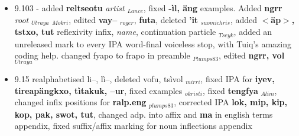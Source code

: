 \documentclass[11pt]{article}
\begin{document}
\begin{itemize}
\item 9.103 - added {\bf reltseotu} {\it artist} $_{Lance}$, fixed {\bf -\`il, \"ang} examples. Added {\bf *ngrr} {\it root} $_{Utraya}$ $_{Mokri}$, edited {\bf vay--} $_{roger}$, {\bf futa}, deleted {\bf *'it} $_{suomichris}$, added {\bf $<$\"ap$>$, tstxo, tut} reflexivity infix, {\it name}, continuation particle $_{Tseyk}$, added an unreleased mark to every IPA word-final voiceless stop, with Tuiq's amazing coding help. changed fyapo to frapo in preamble $_{Plumps83}$, edited {\bf *ngrr, vol} $_{Utraya}$
\item 9.15 realphabetised li--, l\`i--, deleted vofu, ts\`ivol $_{mirri}$, fixed IPA for {\bf iyev, tireap\"angkxo, t\`itakuk, --ur}, fixed examples $_{okristi}$, fixed {\bf tengfya} $_{Alim}$, changed infix positions for {\bf ralp.eng} $_{plumps83}$, corrected IPA {\bf lok, mip, kip, kop, pak, swot, tut}, changed adp. into affix and {\bf ma} in english terms appendix, fixed suffix/affix marking for noun inflections appendix
\end{itemize}
\end{document}
